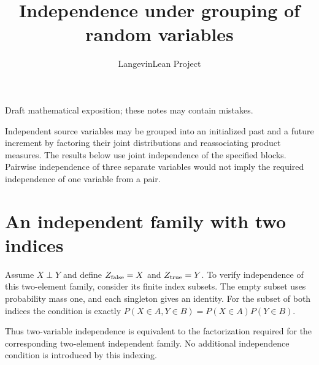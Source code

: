 \documentclass[11pt,a4paper]{article}
\title{\texorpdfstring{Independence under grouping of random variables}{Independence under grouping of random variables}}
\author{LangevinLean Project}
\date{}
\begin{document}
\maketitle
Draft mathematical exposition; these notes may contain mistakes.


Independent source variables may be grouped into an initialized past and a future increment by factoring their joint distributions and reassociating product measures. The results below use joint independence of the specified blocks. Pairwise independence of three separate variables would not imply the required independence of one variable from a pair.


\section{\texorpdfstring{An independent family with two indices}{An independent family with two indices}}


Assume \(X\perp Y\) and define \(Z_{\rm false}=X\) and \(Z_{\rm true}=Y\). To verify independence of this two-element family, consider its finite index subsets. The empty subset uses probability mass one, and each singleton gives an identity. For the subset of both indices the condition is exactly \(P(X\in A,Y\in B)=P(X\in A)P(Y\in B)\).



Thus two-variable independence is equivalent to the factorization required for the corresponding two-element independent family. No additional independence condition is introduced by this indexing.
\end{document}
